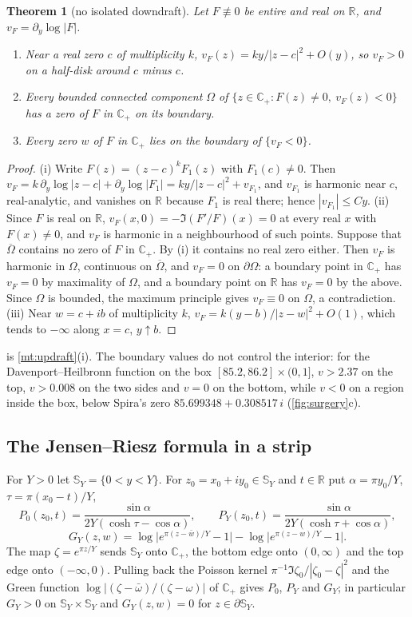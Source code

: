 \documentclass[11pt]{article}
\newtheorem{theorem}{Theorem}[section]
\theoremstyle{definition}\newtheorem{definition}[theorem]{Definition}
\theoremstyle{remark}\newtheorem{remark}[theorem]{Remark}
\newcommand{\R}{\mathbb R}\newcommand{\C}{\mathbb C}\newcommand{\N}{\mathbb N}
\begin{document}
\begin{theorem}[no isolated downdraft]\label{thm:downdraft}
Let $F\not\equiv0$ be entire and real on $\R$, and $v_F=\partial_y\log|F|$.
\begin{enumerate}[label=(\roman*)]
\item Near a real zero $c$ of multiplicity $k$, $v_F(z)=ky/|z-c|^2+O(y)$, so $v_F>0$ on a half-disk around $c$ minus $c$.
\item Every bounded connected component $\Omega$ of $\{z\in\C_+:F(z)\ne0,\ v_F(z)<0\}$ has a zero of $F$ in $\C_+$ on its boundary.
\item Every zero $w$ of $F$ in $\C_+$ lies on the boundary of $\{v_F<0\}$.
\end{enumerate}
\end{theorem}
\begin{proof}
(i) Write $F(z)=(z-c)^kF_1(z)$ with $F_1(c)\ne0$. Then $v_F=k\,\partial_y\log|z-c|+\partial_y\log|F_1|=ky/|z-c|^2+v_{F_1}$, and $v_{F_1}$ is harmonic near $c$, real-analytic, and vanishes on $\R$ because $F_1$ is real there; hence $|v_{F_1}|\le Cy$.
(ii) Since $F$ is real on $\R$, $v_F(x,0)=-\Im(F'/F)(x)=0$ at every real $x$ with $F(x)\ne0$, and $v_F$ is harmonic in a neighbourhood of such points. Suppose that $\overline\Omega$ contains no zero of $F$ in $\C_+$. By (i) it contains no real zero either. Then $v_F$ is harmonic in $\Omega$, continuous on $\overline\Omega$, and $v_F=0$ on $\partial\Omega$: a boundary point in $\C_+$ has $v_F=0$ by maximality of $\Omega$, and a boundary point on $\R$ has $v_F=0$ by the above. Since $\Omega$ is bounded, the maximum principle gives $v_F\equiv0$ on $\Omega$, a contradiction.
(iii) Near $w=c+ib$ of multiplicity $k$, $v_F=k(y-b)/|z-w|^2+O(1)$, which tends to $-\infty$ along $x=c$, $y\uparrow b$.
\end{proof}

 is \cref{mt:updraft}(i). The boundary values do not control the interior: for the Davenport--Heilbronn function on the box $[85.2,86.2]\times(0,1]$, $v>2.37$ on the top, $v>0.008$ on the two sides and $v=0$ on the bottom, while $v<0$ on a region inside the box, below Spira's zero $85.699348+0.308517\,i$ (\cref{fig:surgery}c).

\subsection{The Jensen--Riesz formula in a strip}
For $Y>0$ let $\mathbb S_Y=\{0<y<Y\}$. For $z_0=x_0+iy_0\in\mathbb S_Y$ and $t\in\R$ put $\alpha=\pi y_0/Y$, $\tau=\pi(x_0-t)/Y$,
\[
P_0(z_0,t)=\frac{\sin\alpha}{2Y(\cosh\tau-\cos\alpha)},\qquad P_Y(z_0,t)=\frac{\sin\alpha}{2Y(\cosh\tau+\cos\alpha)},
\]
\[
G_Y(z,w)=\log\bigl|e^{\pi(z-\bar w)/Y}-1\bigr|-\log\bigl|e^{\pi(z-w)/Y}-1\bigr| .
\]
The map $\zeta=e^{\pi z/Y}$ sends $\mathbb S_Y$ onto $\C_+$, the bottom edge onto $(0,\infty)$ and the top edge onto $(-\infty,0)$. Pulling back the Poisson kernel $\pi^{-1}\Im\zeta_0/|\zeta_0-\zeta|^2$ and the Green function $\log|(\zeta-\bar\omega)/(\zeta-\omega)|$ of $\C_+$ gives $P_0$, $P_Y$ and $G_Y$; in particular $G_Y>0$ on $\mathbb S_Y\times\mathbb S_Y$ and $G_Y(z,w)=0$ for $z\in\partial\mathbb S_Y$.
\end{document}
